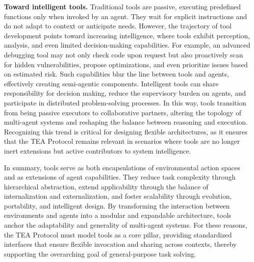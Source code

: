 \documentclass[11pt]{article}
\begin{document}
\textbf{Toward intelligent tools.}  
Traditional tools are passive, executing predefined functions only when invoked by an agent. They wait for explicit instructions and do not adapt to context or anticipate needs. However, the trajectory of tool development points toward increasing intelligence, where tools exhibit perception, analysis, and even limited decision-making capabilities. For example, an advanced debugging tool may not only check code upon request but also proactively scan for hidden vulnerabilities, propose optimizations, and even prioritize issues based on estimated risk. Such capabilities blur the line between tools and agents, effectively creating semi-agentic components. Intelligent tools can share responsibility for decision making, reduce the supervisory burden on agents, and participate in distributed problem-solving processes. In this way, tools transition from being passive executors to collaborative partners, altering the topology of multi-agent systems and reshaping the balance between reasoning and execution. Recognizing this trend is critical for designing flexible architectures, as it ensures that the TEA Protocol remains relevant in scenarios where tools are no longer inert extensions but active contributors to system intelligence.  

In summary, tools serve as both encapsulations of environmental action spaces and as extensions of agent capabilities. They reduce task complexity through hierarchical abstraction, extend applicability through the balance of internalization and externalization, and foster scalability through evolution, portability, and intelligent design. By transforming the interaction between environments and agents into a modular and expandable architecture, tools anchor the adaptability and generality of multi-agent systems. For these reasons, the TEA Protocol must model tools as a core pillar, providing standardized interfaces that ensure flexible invocation and sharing across contexts, thereby supporting the overarching goal of general-purpose task solving.  


\end{document}
